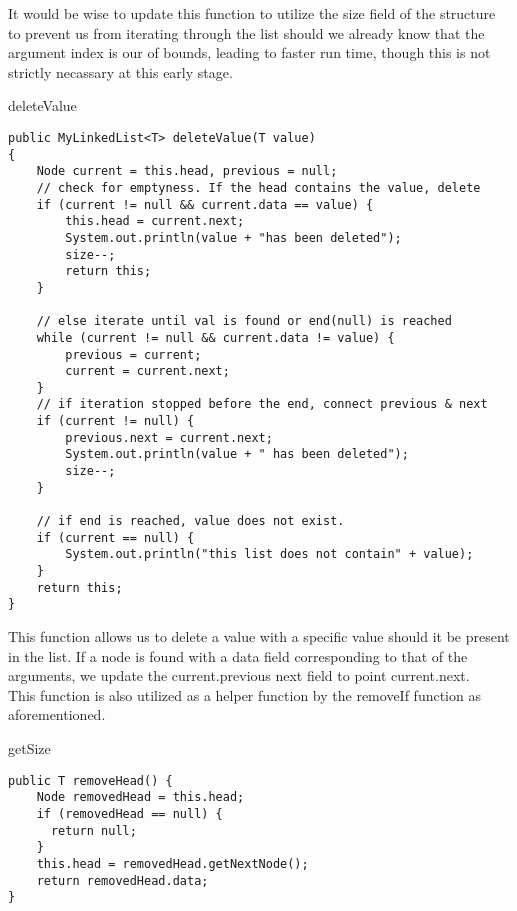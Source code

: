 \documentclass[a4paper]{article}
\begin{document}
It would be wise to update this function to utilize the size field
of the structure to prevent us from iterating through the list 
should we already know that the argument index is our of bounds,
leading to faster run time, though this is not strictly
necassary at this early stage.

\newpage

\begin{algorithm}
\caption{deleteValue}\label{euclid}

\begin{verbatim}
public MyLinkedList<T> deleteValue(T value)
{
    Node current = this.head, previous = null;
    // check for emptyness. If the head contains the value, delete
    if (current != null && current.data == value) {
        this.head = current.next; 
        System.out.println(value + "has been deleted");
        size--;
        return this;
    }

    // else iterate until val is found or end(null) is reached
    while (current != null && current.data != value) {
        previous = current;
        current = current.next;
    }
    // if iteration stopped before the end, connect previous & next
    if (current != null) {
        previous.next = current.next;
        System.out.println(value + " has been deleted");
        size--;
    }
    
    // if end is reached, value does not exist. 
    if (current == null) {
        System.out.println("this list does not contain" + value);
    }
    return this;
}
\end{verbatim}
\end{algorithm}

This function allows us to delete a value with a specific value 
should it be present in the list. If a node is found with a 
data field corresponding to that of the arguments, we update 
the current.previous next field to point current.next. \\

This function is also utilized as a helper function by the removeIf
function as aforementioned.

\newpage


\begin{algorithm}
\caption{getSize}\label{euclid}

\begin{verbatim}
public T removeHead() {
    Node removedHead = this.head;
    if (removedHead == null) {
      return null;
    }
    this.head = removedHead.getNextNode();
    return removedHead.data;
}



\end{verbatim}
\end{algorithm}
\end{document}
